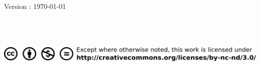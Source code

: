 \newpage                
\clearpage
\thispagestyle{empty}
\null\vfill
\raggedright
Version : \today \\
\bigskip
\LABname \\
\LABaff \\
\LABaddress \\
\bigskip \bigskip
\begin{center}
\includegraphics[height=0.05\linewidth]{Frontmatter/images/licence.png}
\end{center}
\bigskip
\null
